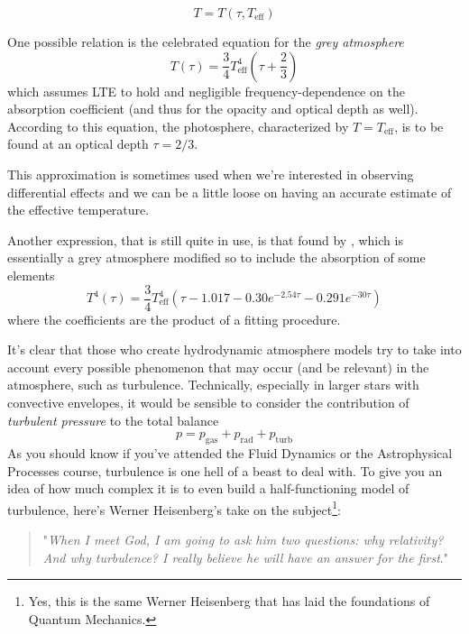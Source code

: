 \begin{equation*}
    T = T(\tau, T_{\text{eff}})
\end{equation*}
\par One possible relation is the celebrated equation for the \emph{grey atmosphere}
\begin{equation}
    T(\tau) = \frac{3}{4}T_{\text{eff}}^{4}\left(\tau + \frac{2}{3}\right)
    \label{eq:greyatmosphere_temp}
\end{equation}
which assumes LTE to hold and negligible frequency-dependence on the absorption coefficient (and thus for the opacity and optical depth as well). According to this equation, the photosphere, characterized by $T = T_{\text{eff}}$, is to be found at an optical depth $\tau = 2/3$.
\par This approximation is sometimes used when we're interested in observing differential effects and we can be a little loose on having an accurate estimate of the effective temperature.
\par Another expression, that is still quite in use, is that found by \cite{1969Ap&SS...3..552K}, which is essentially a grey atmosphere modified so to include the absorption of some elements
\begin{equation}
    T^{4}(\tau) = \frac{3}{4}T_{\text{eff}}^{4}\left(\tau - 1.017-0.30e^{-2.54\tau}-0.291e^{-30\tau}\right)
    \label{eq:krishna_swamy_greyatmosphere}
\end{equation}
where the coefficients are the product of a fitting procedure.
\par It's clear that those who create hydrodynamic atmosphere models try to take into account every possible phenomenon that may occur (and be relevant) in the atmosphere, such as turbulence. Technically, especially in larger stars with convective envelopes, it would be sensible to consider the contribution of \emph{turbulent pressure} to the total balance
\begin{equation*}
    p = p_{\text{gas}}+p_{\text{rad}}+p_{\text{turb}}
\end{equation*}
As you should know if you've attended the Fluid Dynamics or the Astrophysical Processes course, turbulence is one hell of a beast to deal with. To give you an idea of how much complex it is to even build a half-functioning model of turbulence, here's Werner Heisenberg's take on the subject\footnote{Yes, this is the same Werner Heisenberg that has laid the foundations of Quantum Mechanics.}:
\begin{quote}
   "\emph{When I meet God, I am going to ask him two questions: why relativity? And why turbulence? I really believe he will have an answer for the first}."
\end{quote}
